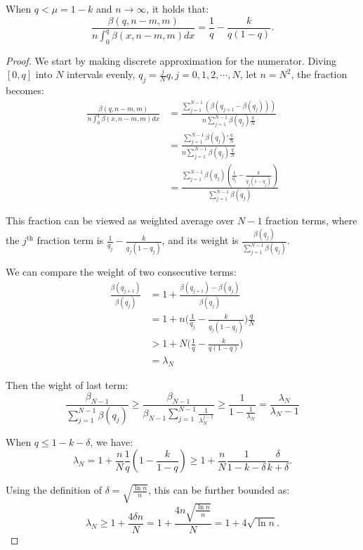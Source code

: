 \begin{lemma}\label{lem:3}
    When $q<\mu=1-k$ and $n\rightarrow \infty$, it holds that:
    $$\frac{\beta(q,n-m,m)}{n\int_0^q\beta(x,n-m,m)dx}=\frac{1}{q}-\frac{k}{q(1-q)}.$$
\end{lemma}
\begin{proof}
    We start by making discrete approximation for the numerator. Diving $[0,q]$ into $N$ intervals evenly, $q_j=\frac{j}{N}q,j=0,1,2,\cdots,N$, let $n=N^2$, the fraction becomes:
$$
\begin{aligned}
\frac{\beta(q,n-m,m)}{n\int_0^q\beta(x,n-m,m)dx} & =\frac{\sum_{j=1}^{N-1}(\beta(q_{j+1}-\beta(q_j)))}{n\sum_{j=1}^{N-1}\beta(q_{j})\frac{q}{N}}\\ &= \frac{\sum_{j=1}^{N-1}\beta(q_j)'\frac{q}{N}}{n\sum_{j=1}^{N-1}\beta(q_{j})\frac{q}{N}}\\&=\frac{\sum_{j=1}^{N-1}\beta(q_j)(\frac{1}{q_j}-\frac{k}{q_j(1-q_j)})}{\sum_{j=1}^{N-1}\beta(q_{j})}
\end{aligned}
$$

This fraction can be viewed as weighted average over $N-1$ fraction terms, where the $j^{\text{th}}$ fraction term is $\frac{1}{q_j}-\frac{k}{q_j(1-q_j)}$, and its weight is $\frac{\beta(q_{j})}{\sum_{j=1}^{N-1}\beta(q_{j})}$.

We can compare the weight of two consecutive terms:
$$
\begin{aligned}
\frac{\beta(q_{j+1})}{\beta(q_j)} & =1+\frac{\beta(q_{j+1})-\beta(q_j)}{\beta(q_j)}\\ &=1+n\big(\frac{1}{q_j}-\frac{k}{q_j(1-q_j)}\big)\frac{q}{N}\\ &>1+N\big(\frac{1}{q}-\frac{k}{q(1-q)}\big)\\ &=\lambda_N
\end{aligned}
$$

Then the wight of last term:
$$\frac{\beta_{N-1}}{\sum_{j=1}^{N-1}\beta(q_{j})}\ge\frac{\beta_{N-1}}{\beta_{N-1}\sum_{j=1}^{N-1}\frac{1}{\lambda_N^{j-1}}}\ge \frac{1}{1-\frac{1}{\lambda_N}}=\frac{\lambda_N}{\lambda_N-1}$$

When \( q \leq 1-k-\delta \), we have:
\[
\lambda_N = 1 + \frac{n}{N} \frac{1}{q} \left( 1 - \frac{k}{1-q} \right) \geq 1 + \frac{n}{N} \frac{1}{1-k-\delta} \frac{\delta}{k+\delta}.
\]

Using the definition of \(\delta = \sqrt{\frac{\ln n}{n}}\), this can be further bounded as:
\[
\lambda_N \geq 1 + \frac{4 \delta n}{N} = 1 + \frac{4n \sqrt{\frac{\ln n}{n}}}{N} = 1 + 4\sqrt{\ln n}.
\]


\end{proof}
